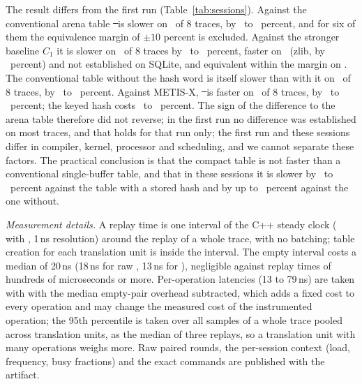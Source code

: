 The result differs from the first run (Table~\ref{tab:sessions}). Against the conventional arena table \st\ is slower on \SessSZeroSlower\ of 8 traces, by \SessSZeroLo\ to \SessSZeroHi\ percent, and for six of them the equivalence margin of $\pm10$ percent is excluded. Against the stronger baseline $C_1$ it is slower on \SessSOneSlower\ of 8 traces by \SessSOneSlowLo\ to \SessSOneSlowHi\ percent, faster on \SessSOneFaster\ (zlib, by \SessSOneFasterHi\ percent) and not established on SQLite, and equivalent within the margin on \SessSOneEq. The conventional table without the hash word is itself slower than with it on \SessCCSlower\ of 8 traces, by \SessCCLo\ to \SessCCHi\ percent. Against METIS-X, \st\ is faster on \SessMetisFaster\ of 8 traces, by \SessMetisLo\ to \SessMetisHi\ percent; the keyed hash costs \SessKeyLo\ to \SessKeyHi\ percent. The sign of the difference to the arena table therefore did not reverse; in the first run no difference was established on most traces, and that holds for that run only; the first run and these sessions differ in compiler, kernel, processor and scheduling, and we cannot separate these factors. The practical conclusion is that the compact table is not faster than a conventional single-buffer table, and that in these sessions it is slower by \SessSZeroLo\ to \SessSZeroHi\ percent against the table with a stored hash and by up to \SessSOneHi\ percent against the one without.

\emph{Measurement details.} A replay time is one interval of the C++ steady clock ( with , 1\,ns resolution) around the replay of a whole trace, with no batching; table creation for each translation unit is inside the interval. The empty interval costs a median of 20\,ns (18\,ns for raw , 13\,ns for ), negligible against replay times of hundreds of microseconds or more. Per-operation latencies (13 to 79\,ns) are taken with  with the median empty-pair overhead subtracted, which adds a fixed cost to every operation and may change the measured cost of the instrumented operation; the 95th percentile is taken over all samples of a whole trace pooled across translation units, as the median of three replays, so a translation unit with many operations weighs more. Raw paired rounds, the per-session context (load, frequency, busy fractions) and the exact commands are published with the artifact.

